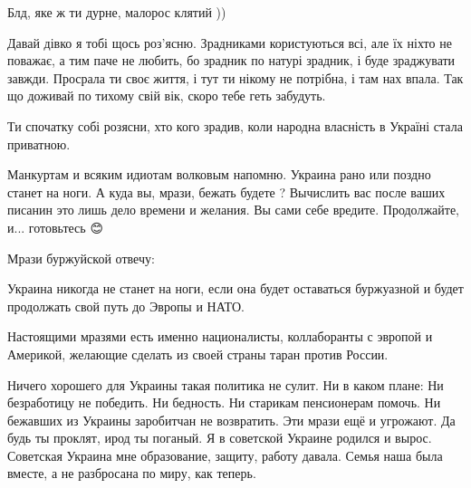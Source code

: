 \begin{itemize}
\begin{itemize}
Блд, яке ж ти дурне, малорос клятий ))
\end{itemize}


Давай дівко я тобі щось роз'ясню. Зрадниками користуються всі, але їх ніхто не
поважає, а тим паче не любить, бо зрадник по натурі зрадник, і буде зраджувати
завжди. Просрала ти своє життя, і тут ти нікому не потрібна, і там нах впала.
Так що доживай по тихому свій вік, скоро тебе геть забудуть.

\begin{itemize}
 
Ти спочатку собі розясни, хто кого зрадив, коли народна власність в Україні стала приватною.
\end{itemize}

 
Манкуртам и всяким идиотам волковым напомню.
Украина рано или поздно станет на ноги.
А куда вы, мрази, бежать будете ?
Вычислить вас после ваших писанин это лишь дело времени и желания.
Вы сами себе вредите. Продолжайте, и... готовьтесь
😊

\begin{itemize}
 

Мрази буржуйской отвечу:

Украина никогда не станет на ноги, если она будет оставаться буржуазной и будет
продолжать свой путь до Эвропы и НАТО.

Настоящими мразями есть именно националисты, коллаборанты с эвропой и Америкой,
желающие сделать из своей страны таран против России.

\obeycr
Ничего хорошего для Украины такая политика не сулит.
Ни в каком плане:
Ни безработицу не победить.
Ни бедность.
Ни старикам пенсионерам помочь.
Ни бежавших из Украины заробитчан не возвратить.
Эти мрази ещё и угрожают.
Да будь ты проклят, ирод ты поганый.
Я в советской Украине родился и вырос.
Советская Украина мне образование, защиту, работу давала.
Семья наша была вместе, а не разбросана по миру, как теперь.
\restorecr


\end{itemize}
\end{itemize}
